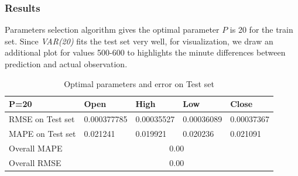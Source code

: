 \documentclass[11pt]{article}
\begin{document}
\subsubsection{Results}
Parameters selection algorithm gives the optimal parameter $P$ is 20 for the
train set. Since \textit{VAR(20)} fits the test set very well, for
visualization, we draw an additional plot for values 500-600 to highlights the
minute differences between prediction and actual observation.

\begin{table}[H]
\begin{tabular}{|l|l|l|l|l|}
  \hline
  P=20             & Open        & High       & Low        & Close      \\ \hline
  RMSE on Test set & 0.000377785 & 0.00035527 & 0.00036089 & 0.00037367 \\ \hline
  MAPE on Test set & 0.021241    & 0.019921   & 0.020236   & 0.021091   \\ \hline
  Overall MAPE     & \multicolumn{4}{c|}{0.00}                          \\ \hline
  Overall RMSE     & \multicolumn{4}{c|}{0.00}                          \\ \hline
\end{tabular}
\caption{Optimal parameters and error on Test set}
\end{table}
\end{document}
